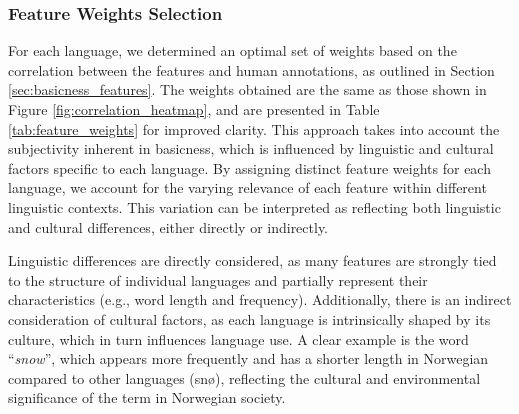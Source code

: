 \documentclass[preprint,12pt,authoryear]{elsarticle}
\begin{document}
\subsubsection{Feature Weights Selection}

For each language, we determined an optimal set of weights based on the correlation between the features and human annotations, as outlined in Section \ref{sec:basicness_features}. The weights obtained are the same as those shown in Figure \ref{fig:correlation_heatmap}, and are presented in Table \ref{tab:feature_weights} for improved clarity. This approach takes into account the subjectivity inherent in basicness, which is influenced by linguistic and cultural factors specific to each language. By assigning distinct feature weights for each language, we account for the varying relevance of each feature within different linguistic contexts. This variation can be interpreted as reflecting both linguistic and cultural differences, either directly or indirectly.

Linguistic differences are directly considered, as many features are strongly tied to the structure of individual languages and partially represent their characteristics (e.g., word length and frequency). Additionally, there is an indirect consideration of cultural factors, as each language is intrinsically shaped by its culture, which in turn influences language use. A clear example is the word ``\textit{snow}'', which appears more frequently and has a shorter length in Norwegian compared to other languages (snø), reflecting the cultural and environmental significance of the term in Norwegian society.
\end{document}
